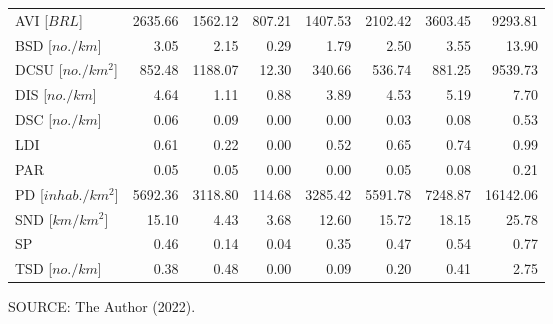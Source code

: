 \begin{table}[!htbp]
\begin{tabular}{lrrrrrrr}
        AVI [$BRL$] & 2635.66 & 1562.12 & 807.21 & 1407.53 & 2102.42 & 3603.45 & 9293.81 \\ 
        BSD [$no./km$] & 3.05 & 2.15 & 0.29 & 1.79 & 2.50 & 3.55 & 13.90 \\ 
        DCSU [$no./km^2$] & 852.48 & 1188.07 & 12.30 & 340.66 & 536.74 & 881.25 & 9539.73 \\ 
        DIS [$no./km$] & 4.64 & 1.11 & 0.88 & 3.89 & 4.53 & 5.19 & 7.70 \\ 
        DSC [$no./km$] & 0.06 & 0.09 & 0.00 & 0.00 & 0.03 & 0.08 & 0.53 \\ 
        LDI & 0.61 & 0.22 & 0.00 & 0.52 & 0.65 & 0.74 & 0.99 \\ 
        PAR & 0.05 & 0.05 & 0.00 & 0.00 & 0.05 & 0.08 & 0.21 \\ 
        PD [$inhab./km^2$] & 5692.36 & 3118.80 & 114.68 & 3285.42 & 5591.78 & 7248.87 & 16142.06 \\ 
        SND [$km/km^2$] & 15.10 & 4.43 & 3.68 & 12.60 & 15.72 & 18.15 & 25.78 \\ 
        SP & 0.46 & 0.14 & 0.04 & 0.35 & 0.47 & 0.54 & 0.77 \\ 
        TSD [$no./km$] & 0.38 & 0.48 & 0.00 & 0.09 & 0.20 & 0.41 & 2.75 \\ 
        \hline
    \end{tabular}
    \label{tab:var_summary}
    \par \vspace{2mm} \footnotesize \raggedright
    SOURCE: The Author (2022).
\end{table}



